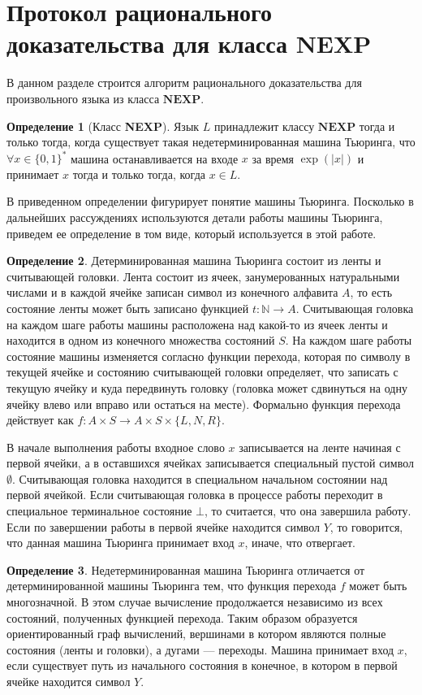 \documentclass{mipt-thesis-bs}
\theoremstyle{plain}
\theoremstyle{definition}
\newtheorem{definition}{Определение}
\newcommand{\word}{\{0, 1\}^*}
\begin{document}
\section{Протокол рационального доказательства для класса $\textbf{NEXP}$}
В данном разделе строится алгоритм рационального доказательства для произвольного языка из класса $\textbf{NEXP}$.
\begin{definition}[Класс \textbf{NEXP}]Язык $L$ принадлежит классу $\textbf{NEXP}$ тогда и только тогда, когда существует такая недетерминированная машина Тьюринга, что $\forall x \in \word$ машина останавливается на входе $x$ за время $\exp(|x|)$ и принимает $x$ тогда и только тогда, когда $x \in L$.
\end{definition}
В приведенном определении фигурирует понятие машины Тьюринга. Посколько в дальнейших рассуждениях используются детали работы машины Тьюринга, приведем ее определение в том виде, который используется в этой работе.
\begin{definition}Детерминированная машина Тьюринга состоит из ленты и считывающей головки. Лента состоит из ячеек, занумерованных натуральными числами и в каждой ячейке записан символ из конечного алфавита $A$, то есть состояние ленты может быть записано функцией $t: \mathbb{N} \longrightarrow A$. Считывающая головка на каждом шаге работы машины расположена над какой-то из ячеек ленты и находится в одном из конечного множества состояний $S$. На каждом шаге работы состояние машины изменяется согласно функции перехода, которая по символу в текущей ячейке и состоянию считывающей головки определяет, что записать с текущую ячейку и куда передвинуть головку (головка может сдвинуться на одну ячейку влево или вправо или остаться на месте). Формально функция перехода действует как $f: A \times S \longrightarrow A \times S \times \{L, N, R\}$.

В начале выполнения работы входное слово $x$ записывается на ленте начиная с первой ячейки, а в оставшихся ячейках записывается специальный пустой символ $\emptyset$. Считывающая головка находится в специальном начальном состоянии над первой ячейкой. Если считывающая головка в процессе работы переходит в специальное терминальное состояние $\bot$, то считается, что она завершила работу. Если по завершении работы в первой ячейке находится символ $Y$, то говорится, что данная машина Тьюринга принимает вход $x$, иначе, что отвергает.
\end{definition}
\begin{definition}
    Недетерминированная машина Тьюринга отличается от детерминированной машины Тьюринга тем, что функция перехода $f$ может быть многозначной. В этом случае вычисление продолжается независимо из всех состояний, полученных функцией перехода. Таким образом образуется ориентированный граф вычислений, вершинами в котором являются полные состояния (ленты и головки), а дугами --- переходы. Машина принимает вход $x$, если существует путь из начального состояния в конечное, в котором в первой ячейке находится символ $Y$.
\end{definition}
\end{document}
